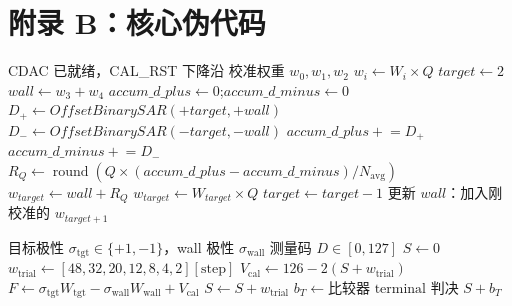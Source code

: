 \documentclass[
  UTF8,
  a4paper,
  11pt,
  oneside,
  fontset=fandol
]{ctexrep}
\newcommand{\round}{\operatorname{round}}
\newcommand{\Vcal}{V_{\mathrm{cal}}}
\newcommand{\roundop}[1]{\round\!\left(#1\right)}
\begin{document}
\chapter*{附录 B：核心伪代码}

\begin{algorithm}[H]
\caption{前景权重校准}
\label{alg:cal}
\begin{algorithmic}[1]
\Require CDAC 已就绪，CAL\_RST 下降沿
\Ensure 校准权重 $w_0, w_1, w_2$
\State $w_i \gets W_i \times Q$ 
\State $\mathit{target} \gets 2$ 
\State $\mathit{wall} \gets w_3 + w_4$
    \State $\mathit{accum\_d\_plus} \gets 0$;\quad $\mathit{accum\_d\_minus} \gets 0$
        \State $D_+ \gets \mathit{OffsetBinarySAR}(+\mathit{target}, +\mathit{wall})$
        \State $D_- \gets \mathit{OffsetBinarySAR}(-\mathit{target}, -\mathit{wall})$
        \State $\mathit{accum\_d\_plus} \mathrel{+}= D_+$
        \State $\mathit{accum\_d\_minus} \mathrel{+}= D_-$
    \EndFor
    \State $R_Q \gets \roundop{Q \times (\mathit{accum\_d\_plus} - \mathit{accum\_d\_minus}) / N_{\mathrm{avg}}}$
    \State $w_{\mathit{target}} \gets \mathit{wall} + R_Q$
        \State $w_{\mathit{target}} \gets W_{\mathit{target}} \times Q$ 
    \EndIf
    \State $\mathit{target} \gets \mathit{target} - 1$
    \State 更新 $\mathit{wall}$：加入刚校准的 $w_{\mathit{target}+1}$
\EndWhile
\end{algorithmic}
\end{algorithm}

\begin{algorithm}[H]
\caption{Offset-binary SAR 单方向测量}
\label{alg:offsar}
\begin{algorithmic}[1]
\Require 目标极性 $\sigma_{\mathrm{tgt}} \in \{+1,-1\}$，wall 极性 $\sigma_{\mathrm{wall}}$
\Ensure 测量码 $D \in [0, 127]$
\State $S \gets 0$ 
    \State $w_{\mathrm{trial}} \gets [48, 32, 20, 12, 8, 4, 2][\text{step}]$
    \State $\Vcal \gets 126 - 2(S + w_{\mathrm{trial}})$
    \State $F \gets \sigma_{\mathrm{tgt}} W_{\mathrm{tgt}} - \sigma_{\mathrm{wall}} W_{\mathrm{wall}} + \Vcal$
        \State $S \gets S + w_{\mathrm{trial}}$ 
    \EndIf
\EndFor
\State $b_T \gets \text{比较器 terminal 判决}$
\State \Return $S + b_T$
\end{algorithmic}
\end{algorithm}
\end{document}

